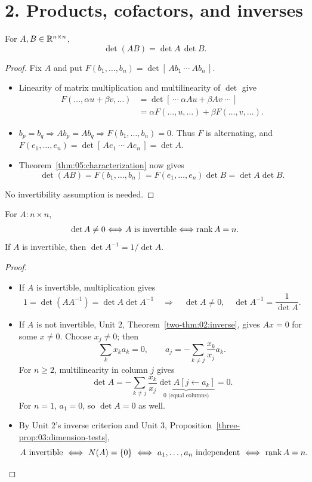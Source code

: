 \section*{2. Products, cofactors, and inverses}

\begin{theorem}[Multiplication]\label{thm:05:product}
For \(A,B\in\mathbb R^{n\times n}\),
\[
\det(AB)=\det A\,\det B.
\]
\end{theorem}
\begin{proof}
Fix \(A\) and put \(F(b_1,\ldots,b_n)=\det[\,Ab_1\ \cdots\ Ab_n\,]\).
\begin{itemize}
\item Linearity of matrix multiplication and multilinearity of \(\det\) give
  \[
  \begin{aligned}
  F(\ldots,\alpha u+\beta v,\ldots)
  &=\det[\,\cdots\ \alpha Au+\beta Av\ \cdots\,]\\
  &=\alpha F(\ldots,u,\ldots)+\beta F(\ldots,v,\ldots).
  \end{aligned}
  \]
\item \(b_p=b_q\Longrightarrow Ab_p=Ab_q\Longrightarrow F(b_1,\ldots,b_n)=0\).
  Thus \(F\) is alternating, and
  \(F(e_1,\ldots,e_n)=\det[\,Ae_1\ \cdots\ Ae_n\,]=\det A\).
\item Theorem~\ref{thm:05:characterization} now gives
  \[
  \det(AB)=F(b_1,\ldots,b_n)=F(e_1,\ldots,e_n)\det B=\det A\det B.
  \]
\end{itemize}
No invertibility assumption is needed.
\end{proof}

\begin{proposition}\label{prop:05:invertibility}
For \(A:n\times n\),
\[
\det A\ne0\Longleftrightarrow A\text{ is invertible}
\Longleftrightarrow\operatorname{rank} A=n.
\]
If \(A\) is invertible, then
\(\det A^{-1}=1/\det A\).
\end{proposition}
\begin{proof}
\begin{itemize}
\item If \(A\) is invertible, multiplication gives
  \[
  1=\det(AA^{-1})=\det A\det A^{-1}
  \quad\Longrightarrow\quad\det A\ne0,\quad\det A^{-1}=\frac1{\det A}.
  \]
\item If \(A\) is not invertible, Unit 2, Theorem~\ref{two-thm:02:inverse},
  gives \(Ax=0\) for some \(x\ne0\). Choose \(x_j\ne0\); then
  \[
  \sum_kx_ka_k=0,\qquad a_j=-\sum_{k\ne j}\frac{x_k}{x_j}a_k.
  \]
  For \(n\geqslant2\), multilinearity in column \(j\) gives
  \[
  \det A=-\sum_{k\ne j}\frac{x_k}{x_j}
             \underbrace{\det A[j\leftarrow a_k]}_{0\text{ (equal columns)}}=0.
  \]
  For \(n=1\), \(a_1=0\), so \(\det A=0\) as well.
\item By Unit 2's inverse criterion and Unit 3,
  Proposition~\ref{three-prop:03:dimension-tests},
  \[
  A\text{ invertible}\ \Longleftrightarrow\ N(A)=\{0\}
  \ \Longleftrightarrow\ a_1,\ldots,a_n\text{ independent}
  \ \Longleftrightarrow\ \rank A=n.
  \]
\end{itemize}
\end{proof}

